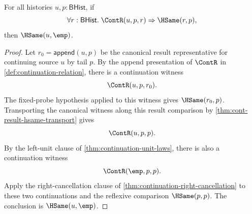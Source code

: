 \begin{theorem}
\label{thm:cont-fixed-left-unit-probe-empty-source}
For all histories $u,p:\mathsf{BHist}$, if
$$
\forall r:\mathsf{BHist}.\; \ContR(u,p,r)\Rightarrow \HSame(r,p),
$$
then $\HSame(u,\emp)$.
\end{theorem}
\begin{proof}
Let $r_0=\mathsf{append}(u,p)$ be the canonical result representative for continuing source $u$ by tail $p$. By the append presentation of $\ContR$ in \autoref{def:continuation-relation}, there is a continuation witness
$$
\ContR(u,p,r_0).
$$
The fixed-probe hypothesis applied to this witness gives $\HSame(r_0,p)$. Transporting the canonical witness along this result comparison by \autoref{thm:cont-result-hsame-transport} gives
$$
\ContR(u,p,p).
$$
By the left-unit clause of \autoref{thm:continuation-unit-laws}, there is also a continuation witness
$$
\ContR(\emp,p,p).
$$
Apply the right-cancellation clause of \autoref{thm:continuation-right-cancellation} to these two continuations and the reflexive comparison $\HSame(p,p)$. The conclusion is $\HSame(u,\emp)$.
\end{proof}
